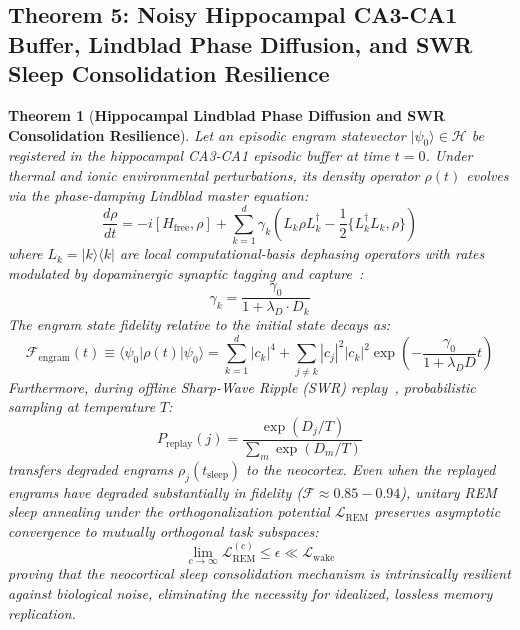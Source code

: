 \documentclass[10pt,twocolumn,3p]{article}
\newtheorem{theorem}{Theorem}
\begin{document}
\subsection{Theorem 5: Noisy Hippocampal CA3-CA1 Buffer, Lindblad Phase Diffusion, and SWR Sleep Consolidation Resilience}
\label{subsec:thm_hippocampal_buffer}

\begin{theorem}[\textbf{Hippocampal Lindblad Phase Diffusion and SWR Consolidation Resilience}]
\label{thm:hippocampal_buffer}
Let an episodic engram statevector $|\psi_0\rangle \in \mathcal{H}$ be registered in the hippocampal CA3-CA1 episodic buffer at time $t = 0$. Under thermal and ionic environmental perturbations, its density operator $\rho(t)$ evolves via the phase-damping Lindblad master equation:
\begin{equation}
    \frac{d\rho}{dt} = -i [H_{\text{free}}, \rho] + \sum_{k=1}^d \gamma_k \left( L_k \rho L_k^\dagger - \frac{1}{2} \{ L_k^\dagger L_k, \rho \} \right)
\end{equation}
where $L_k = |k\rangle\langle k|$ are local computational-basis dephasing operators with rates modulated by dopaminergic synaptic tagging and capture~\cite{frey1997}:
\begin{equation}
    \gamma_k = \frac{\gamma_0}{1 + \lambda_D \cdot D_k}
\end{equation}
The engram state fidelity relative to the initial state decays as:
\begin{equation}
    \mathcal{F}_{\text{engram}}(t) \equiv \langle \psi_0 | \rho(t) | \psi_0 \rangle = \sum_{k=1}^d |c_k|^4 + \sum_{j \ne k} |c_j|^2 |c_k|^2 \exp\left(-\frac{\gamma_0}{1 + \lambda_D D} t\right)
\end{equation}
Furthermore, during offline Sharp-Wave Ripple (SWR) replay~\cite{buzsaki2015}, probabilistic sampling at temperature $T$:
\begin{equation}
    P_{\text{replay}}(j) = \frac{\exp(D_j / T)}{\sum_m \exp(D_m / T)}
\end{equation}
transfers degraded engrams $\rho_j(t_{\text{sleep}})$ to the neocortex. Even when the replayed engrams have degraded substantially in fidelity ($\mathcal{F} \approx 0.85 - 0.94$), unitary REM sleep annealing under the orthogonalization potential $\mathcal{L}_{\text{REM}}$ preserves asymptotic convergence to mutually orthogonal task subspaces:
\begin{equation}
    \lim_{c \to \infty} \mathcal{L}_{\text{REM}}^{(c)} \le \epsilon \ll \mathcal{L}_{\text{wake}}
\end{equation}
proving that the neocortical sleep consolidation mechanism is intrinsically resilient against biological noise, eliminating the necessity for idealized, lossless memory replication.
\end{theorem}
\end{document}
